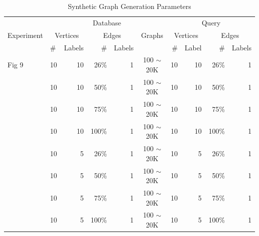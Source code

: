 \begin{table}
\begin{center}
\begin{tabular}{|l|l|r|r|r|c|r|r|r|r|}  \hline
\multirow{3}{*}{Experiment} & \multicolumn{5}{c|}{Database} & \multicolumn{4}{c|}{Query}  \\ \cline{2-2} \cline{3-3} \cline{4-4} \cline{5-5} \cline{6-6} \cline{7-7} \cline{8-8} \cline{9-9} \cline{10-10}
       & \multicolumn{2}{c|}{Vertices} & \multicolumn{2}{c|}{Edges} & Graphs & \multicolumn{2}{c|}{Vertices} & \multicolumn{2}{c|}{Edges} \\ \cline{2-2} \cline{3-3} \cline{4-4} \cline{5-5}  \cline{7-7} \cline{8-8} \cline{9-9} \cline{10-10} 
 & \#  & Labels & \# & Labels &  & \#  & Label & \# & Labels  \\ \hline
Fig 9 & 10 & 10 & 26\% & 1 & 100 $\sim$ 20K & 10 & 10 & 26\% & 1 \\ \hline
  & 10 & 10 & 50\% & 1 & 100 $\sim$ 20K & 10 & 10 & 50\% & 1 \\ \hline
 & 10 & 10 & 75\% & 1 & 100 $\sim$ 20K & 10 & 10 & 75\% & 1 \\ \hline
 & 10 & 10 & 100\% & 1 & 100 $\sim$  20K & 10 & 10 & 100\% & 1 \\ \hline
 & 10 & 5 & 26\% & 1 & 100 $\sim$  20K & 10 & 5 & 26\% & 1 \\ \hline
 & 10 & 5 & 50\% & 1 & 100 $\sim$  20K & 10 & 5 & 50\% & 1 \\ \hline
 & 10 & 5 & 75\% & 1 & 100 $\sim$  20K & 10 & 5 & 75\% & 1 \\ \hline
 & 10 & 5 & 100\% & 1 & 100 $\sim$ 20K & 10 & 5 & 100\% & 1 \\ \hline
\end{tabular}
\caption{ Synthetic Graph Generation Parameters \label{tab:parameterTable} }
\end{center}
\end{table}


